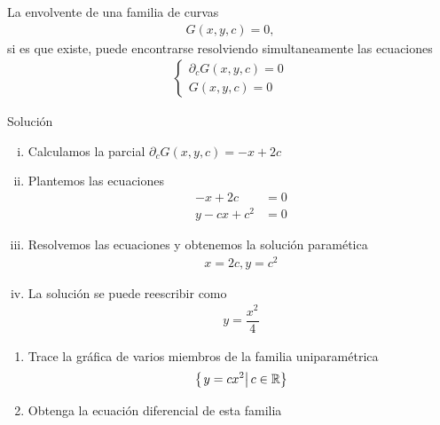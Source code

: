 La envolvente de una familia de curvas
\begin{align}
	G(x,y,c)=0,
\end{align}
si es que existe, puede encontrarse resolviendo simultaneamente las ecuaciones
\begin{align}
	\begin{cases}
		\partial_{c}G(x,y,c) = 0\\
		G(x,y,c) = 0
	\end{cases}
\end{align}



{Solución}
\begin{enumerate}[(i)]
	\item Calculamos la parcial $
	\partial_{c}G(x,y,c) =-x+2c$

	\item Plantemos las ecuaciones
	\begin{align}
		-x+2c&=0\\
		y-cx+c^2&=0
	\end{align}

	\item Resolvemos las ecuaciones y obtenemos la solución paramética
	\begin{align}
		x=2c, y =c^{2}
	\end{align}

	\item La solución se puede reescribir como
	\begin{align}
		y = \dfrac{x^2}{4}
	\end{align}
\end{enumerate}




\begin{resuelto}
	\begin{enumerate}
		\item Trace la gráfica de varios miembros de la familia uniparamétrica $$\left\{ \left.y=cx^2 \right| c\in \mathbb{R} \right\}$$
		\item Obtenga la ecuación diferencial de esta familia
	\end{enumerate}
\end{resuelto}



